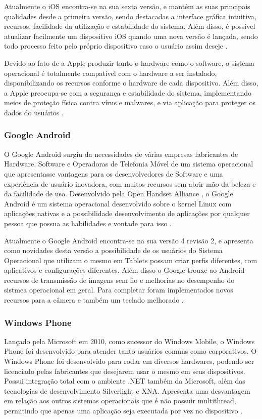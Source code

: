Atualmente o iOS encontra-se na sua sexta versão, e mantém as suas principais qualidades desde a primeira versão, sendo destacadas a interface gráfica intuitiva, recursos, facilidade da utilização e estabilidade do sistema. Além disso, é possível atualizar facilmente um dispositivo iOS quando uma nova versão é lançada, sendo todo processo feito pelo próprio dispositivo caso o usuário assim deseje \cite{Apple}.

Devido ao fato de a Apple produzir tanto o hardware como o software, o sistema operacional é totalmente compatível com o hardware a ser instalado, disponibilizando os recursos conforme o hardware de cada dispositivo. Além disso, a Apple preocupa-se com a segurança e estabilidade do sistema, implementando meios de proteção física contra vírus e malwares, e via aplicação para proteger os dados do usuários \cite{Apple}.

\subsubsection{Google Android}
O Google Android surgiu da necessidades de várias empresas fabricantes de Hardware, Software e Operadoras de Telefonia Móvel de um sistema operacional que apresentasse vantagens para os desenvolvedores de Software e uma experiência de usuário inovadora, com muitos recursos sem abrir mão da beleza e da facilidade de uso. Desenvolvido pela Open Handset Alliance \cite{OHA}, o Google Android é um sistema operacional desenvolvido sobre o kernel Linux com aplicações nativas e a possibilidade desenvolvimento de aplicações por qualquer pessoa que possua as habilidades e vontade para isso \cite{lechetagoogle}.

Atualmente o Google Android encontra-se na sua versão 4 revisão 2, e apresenta como novidades desta versão a possibilidade de os usuários do Sistema Operacional que utilizam o mesmo em Tablets possam criar perfis diferentes, com aplicativos e configurações diferentes. Além disso o Google trouxe ao Android recursos de transmissão de imagens sem fio e melhorias no desempenho do sistmea operacional em geral. Para completar foram implementados novos recursos para a câmera e também um teclado melhorado \cite{GoogleAndroid}.

\subsubsection{Windows Phone}
Lançado pela Microsoft em 2010, como sucessor do Windows Mobile, o Windows Phone foi desenvolvido para atender tanto usuários comuns como corporativos. O Windows Phone foi desenvolvido para rodar em diversos hardwares, podendo ser licenciado pelas fabricantes que desejarem usar o mesmo em seus dispositivos. Possui integração total com o ambiente .NET também da Microsoft, além das tecnologias de desenvolvimento Silverlight e XNA. Apresenta uma desvantagem em relação aos outros sistemas operacionais que é não possuir multithread, permitindo que apenas uma aplicação seja executada por vez no dispositivo \cite{AvaliacaoComparativaSOMoveis}.

